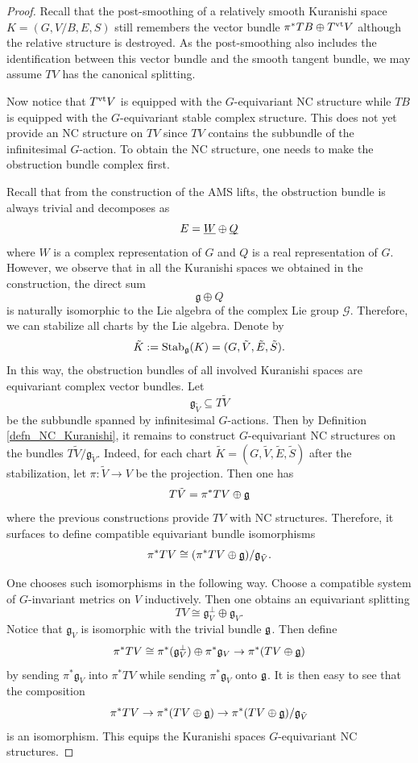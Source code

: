 \documentclass[reqno, 10pt]{amsart}
\numberwithin{equation}{section}
\numberwithin{equation}{section}
\renewcommand{\subset}{\subseteq}
\theoremstyle{definition}
\theoremstyle{remark}
\newcommand{\beqn}{\begin{equation*}}
\newcommand{\eeqn}{\end{equation*}}
\newcommand{\mc}{\mathcal}
\newcommand{\mf}{\mathfrak}
\newcommand{\uds}[1]{\underline{\smash{#1}}}
\begin{document}
\begin{proof}
Recall that the post-smoothing of a relatively smooth Kuranishi space $K = (G, V/B, E, S)$ still remembers the vector bundle $\pi^* TB \oplus T^{\rm vt} V$ although the relative structure is destroyed. As the post-smoothing also includes the identification between this vector bundle and the smooth tangent bundle, we may assume $TV$ has the canonical splitting. 

Now notice that $T^{\rm vt} V$ is equipped with the $G$-equivariant NC structure while $TB$ is equipped with the $G$-equivariant stable complex structure. This does not yet provide an NC structure on $TV$ since $TV$ contains the subbundle of the infinitesimal $G$-action. To obtain the NC structure, one needs to make the obstruction bundle complex first. 

Recall that from the construction of the AMS lifts, the obstruction bundle is always trivial and decomposes as 
\beqn
E = \uds W \oplus \uds Q
\eeqn
where $W$ is a complex representation of $G$ and $Q$ is a real representation of $G$. However, we observe that in all the Kuranishi spaces we obtained in the construction, the direct sum 
\beqn 
{\mf g} \oplus Q
\eeqn
is naturally isomorphic to the Lie algebra of the complex Lie group ${\mc G}$. Therefore, we can stabilize all charts by the Lie algebra. Denote by 
\beqn
\tilde K:= {\rm Stab}_{\mf g} (K) = (G, \tilde V, \tilde E, \tilde S).
\eeqn
In this way, the obstruction bundles of all involved Kuranishi spaces are equivariant complex vector bundles. Let
\beqn
{\mf g}_{\tilde V} \subset T \tilde V
\eeqn
be the subbundle spanned by infinitesimal $G$-actions. Then by Definition \ref{defn_NC_Kuranishi}, it remains to construct $G$-equivariant NC structures on the bundles $T \tilde V/ {\mf g}_{\tilde V}$. Indeed, for each chart $\tilde K = (G, \tilde V, \tilde E, \tilde S)$ after the stabilization, let $\pi: \tilde V \to V$ be the projection. Then one has
\beqn
T\tilde V = \pi^* TV \oplus \uds {\mf g}
\eeqn
where the previous constructions provide $TV$ with NC structures. Therefore, it surfaces to define compatible equivariant bundle isomorphisms
\beqn
\pi^* TV \cong (\pi^* TV \oplus \uds {\mf g})/ {\mf g}_{\tilde V}.
\eeqn

One chooses such isomorphisms in the following way. Choose a compatible system of $G$-invariant metrics on $V$ inductively. Then one obtains an equivariant splitting
\beqn
TV \cong {\mf g}_V^\bot \oplus {\mf g}_V.
\eeqn
Notice that ${\mf g}_V$ is isomorphic with the trivial bundle $\uds {\mf g}$. Then define
\beqn
\pi^* TV \cong \pi^* ({\mf g}_V^\bot) \oplus \pi^* {\mf g}_V \to \pi^*(TV \oplus \uds {\mf g})
\eeqn
by sending $\pi^* {\mf g}_V$ into $\pi^* TV$ while sending $\pi^* {\mf g}_V$ onto $\uds{\mf g}$. It is then easy to see that the composition
\beqn
\pi^* TV \to \pi^* (TV \oplus \uds {\mf g}) \to \pi^* (TV \oplus \uds {\mf g}) / {\mf g}_{\tilde V}
\eeqn
is an isomorphism. This equips the Kuranishi spaces $G$-equivariant NC structures. 
\end{proof}
\end{document}

